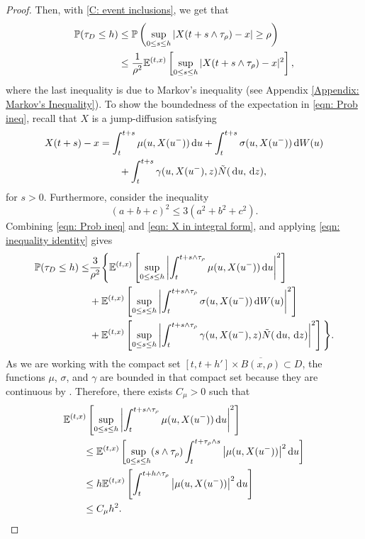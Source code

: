 \begin{proof}
    Then, with \eqref{C: event inclusions}, we get that
    \begin{align}
        \mathbb{P}(\tau_D \leq h) &\leq \mathbb{P} \left(\sup_{0 \leq s \leq h} |X(t+ s \wedge \tau_\rho ) - x| \geq \rho \right) \nonumber \\
        & \leq \frac{1}{\rho^2} \mathbb{E}^{(t,x)} \left[ \sup_{0 \leq s \leq h} |X(t+ s \wedge \tau_\rho ) - x|^2 \right],
        \label{eqn: Prob ineq}
    \end{align}
    where the last inequality is due to Markov's inequality (see Appendix \ref{Appendix: Markov's Inequality}). To show the boundedness of the expectation in \eqref{eqn: Prob ineq}, recall that $X$ is a jump-diffusion satisfying
    \begin{align}
        X(t+s) - x &= \int_t^{t+s} \mu(u,X(u^-)) \,\mathrm{d} u + \int_t^{t+s} \sigma(u,X(u^-)) \,\mathrm{d} W(u) \nonumber\\
        & \qquad + \int_t^{t+s} \gamma(u,X(u^-),z) \tilde N(\,\mathrm{d} u, \,\mathrm{d} z),
        \label{eqn: X in integral form}
    \end{align}
    for $s>0$. Furthermore, consider the inequality 
    \begin{equation}
        (a+b+c)^2 \leq 3 (a^2+b^2+c^2).
        \label{eqn: inequality identity}
    \end{equation}
    Combining \eqref{eqn: Prob ineq} and \eqref{eqn: X in integral form}, and applying \eqref{eqn: inequality identity} gives
    \begin{align}
        \mathbb{P}(\tau_D \leq h) \leq &\frac{3}{\rho^2} \Bigg\{ \mathbb{E}^{(t,x)} \left[\sup_{0 \leq s \leq h} \left|\int_t^{t+ s \wedge \tau_\rho } \mu(u,X(u^-)) \,\mathrm{d} u \right|^2 \right] \nonumber \\
        & + \mathbb{E}^{(t,x)} \left[\sup_{0 \leq s \leq h} \left|\int_t^{t+ s \wedge \tau_\rho } \sigma(u,X(u^-)) \,\mathrm{d} W(u) \right|^2 \right] \nonumber \\
        & + \mathbb{E}^{(t,x)} \left[\sup_{0 \leq s \leq h} \left|\int_t^{t+ s \wedge \tau_\rho } \gamma(u,X(u^-),z) \tilde N(\,\mathrm{d} u, \,\mathrm{d} z) \right|^2 \right] \Bigg\}. \label{eqn: Prob ineq 2}
    \end{align}
    As we are working with the compact set $[t,t+h']\times \overline{B(x,\rho)} \subset D$, the functions $\mu$, $\sigma$, and $\gamma$ are bounded in that compact set because they are continuous by . Therefore, there exists $C_\mu > 0$ such that
    \begin{align}
        & \mathbb{E}^{(t,x)} \left[\sup_{0 \leq s \leq h} \left| \int_t^{t+ s \wedge \tau_\rho} \mu(u,X(u^-)) \,\mathrm{d} u \right|^2 \right] \nonumber \\
        & \qquad \leq \mathbb{E}^{(t,x)} \left[\sup_{0 \leq s \leq h} (s \wedge \tau_\rho) \int_t^{t+\tau_\rho\wedge s} \big|\mu(u,X(u^-)) \big|^2 \,\mathrm{d} u \right] \nonumber \\
        & \qquad \leq h \mathbb{E}^{(t,x)} \left[\int_t^{t+ h \wedge \tau_\rho} \big|\mu(u,X(u^-)) \big|^2 \,\mathrm{d} u \right] \nonumber \\
        & \qquad \leq C_\mu h^2.
        \label{eqn: mu-term inequality}
    \end{align}


\end{proof}
